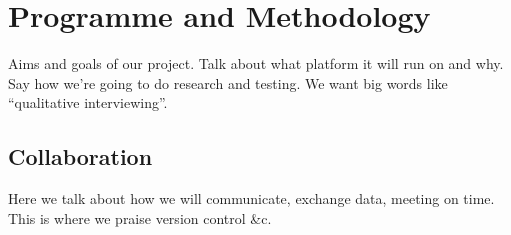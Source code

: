 \documentclass[10pt,a4paper,oneside]{report}
\begin{document}


\clearpage
\section*{Programme and Methodology}

Aims and goals of our project. Talk about what platform it will run on
and why. Say how we're going to do research and testing. We want big
words like ``qualitative interviewing''.

\subsection*{Collaboration}
Here we talk about how we will communicate, exchange data, meeting on
time. This is where we praise version control \&c.



\end{document}
